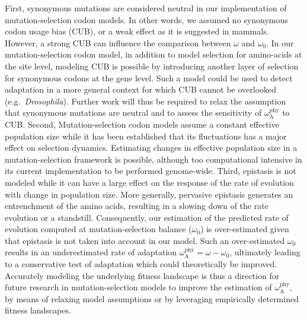 \documentclass[9pt,twocolumn,twoside,lineno]{pnas-new}
\newcommand{\rateApop}{\omega_{\mathrm{A}}}
\newcommand{\rateAphy}{\rateApop^{\mathrm{phy}}}
\begin{document}
First, synonymous mutations are considered neutral in our implementation of mutation-selection codon models.
In other words, we assumed no synonymous codon usage bias (CUB), or a weak effect as it is suggested in mammals\cite{plotkin_synonymous_2011}.
However, a strong CUB can influence the comparison between $\omega$ and $\omega_0$\cite{spielman_relationship_2015}.
In our mutation-selection codon model, in addition to model selection for amino-acids at the site level, modeling CUB is possible by introducing another layer of selection for synonymous codons at the gene level\cite{yang_mutationselection_2008, rodrigue_mechanistic_2010}.
Such a model could be used to detect adaptation in a more general context for which CUB cannot be overlooked (e.g.~\textit{Drosophila}).
Further work will thus be required to relax the assumption that synonymous mutations are neutral and to assess the sensitivity of $\rateAphy$ to CUB.
Second, Mutation-selection codon models assume a constant effective population size while it has been established that its fluctuations has a major effect on selection dynamics\cite{lanfear_population_2014, platt_protein_2018}.
Estimating changes in effective population size in a mutation-selection framework is possible\cite{latrille_inferring_2021}, although too computational intensive in its current implementation to be performed genome-wide.
Third, epistasis is not modeled while it can have a large effect on the response of the rate of evolution with change in population size\cite{latrille_quantifying_2021}.
More generally, pervasive epistasis generates an entrenchment of the amino acids\cite{goldstein_evolutionary_2004, goldstein_nonadaptive_2015, goldstein_sequence_2017}, resulting in a slowing down of the rate evolution\cite{rodrigue_detecting_2017, patel_epistasis_2022} or a standstill\cite{youssef_evolution_2022}.
Consequently, our estimation of the predicted rate of evolution computed at mutation-selection balance ($\omega_0$) is over-estimated given that epistasis is not taken into account in our model.
Such an over-estimated $\omega_0$ results in an underestimated rate of adaptation $\rateAphy = \omega - \omega_0$, ultimately leading to a conservative test of adaptation which could theoretically be improved.
Accurately modeling the underlying fitness landscape is thus a direction for future research in mutation-selection models to improve the estimation of $\rateAphy$, by means of relaxing model assumptions\cite{goldstein_sequence_2017} or by leveraging empirically determined fitness landscapes\cite{bloom_identification_2017, schrempf_scalable_2020}.
\end{document}
